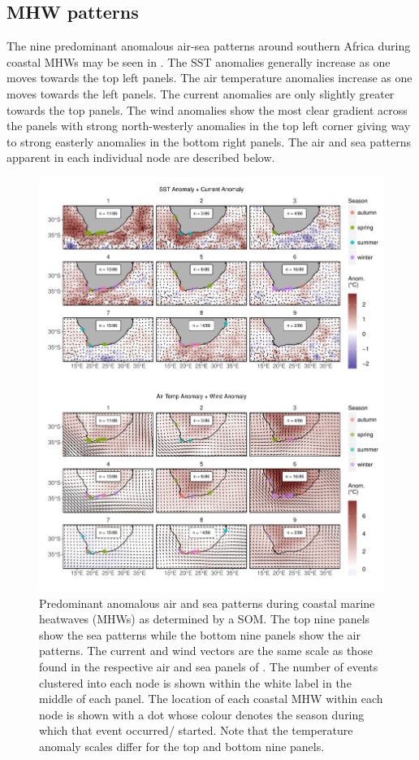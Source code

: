\documentclass[a4paper,10pt,review]{elsarticle}
\begin{document}
\subsection{MHW patterns}
The nine predominant anomalous air-sea patterns around southern Africa during coastal MHWs may be seen in . The SST anomalies generally increase as one moves towards the top left panels. The air temperature anomalies increase as one moves towards the left panels. The current anomalies are only slightly greater towards the top panels. The wind anomalies show the most clear gradient across the panels with strong north-westerly anomalies in the top left corner giving way to strong easterly anomalies in the bottom right panels. The air and sea patterns apparent in each individual node are described below.

\begin{figure}
\includegraphics[width=1.0\textwidth]{figure_4.pdf}
\caption{Predominant anomalous air and sea patterns during coastal marine heatwaves (MHWs) as determined by a SOM. The top nine panels show the sea patterns while the bottom nine panels show the air patterns. The current and wind vectors are the same scale as those found in the respective air and sea panels of . The number of events clustered into each node is shown within the white label in the middle of each panel. The location of each coastal MHW within each node is shown with a dot whose colour denotes the season during which that event occurred/ started. Note that the temperature anomaly scales differ for the top and bottom nine panels.}
\label{figure4}
\end{figure}
\end{document}
